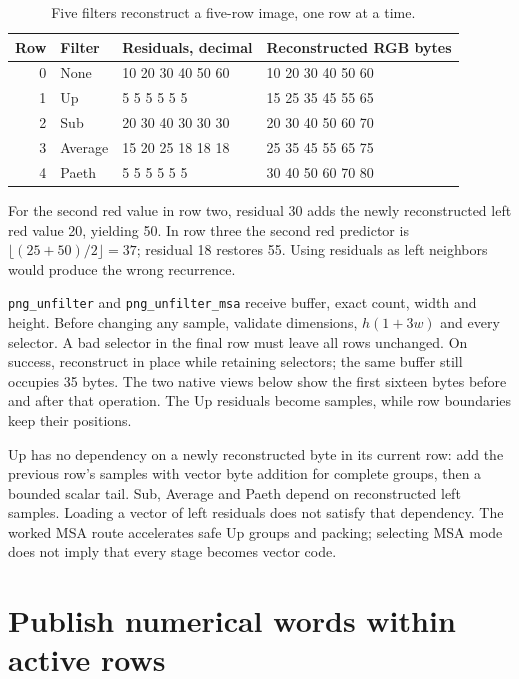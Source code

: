 \begin{table}[!ht]
  \centering
  \begin{tabular}{r l l l}
    \toprule
    Row & Filter  & Residuals, decimal & Reconstructed RGB bytes \\
    \midrule
    0   & None    & 10 20 30 40 50 60  & 10 20 30 40 50 60       \\
    1   & Up      & 5 5 5 5 5 5        & 15 25 35 45 55 65       \\
    2   & Sub     & 20 30 40 30 30 30  & 20 30 40 50 60 70       \\
    3   & Average & 15 20 25 18 18 18  & 25 35 45 55 65 75       \\
    4   & Paeth   & 5 5 5 5 5 5        & 30 40 50 60 70 80       \\
    \bottomrule
  \end{tabular}
  \caption{Five filters reconstruct a five-row image, one row at a time.}
\end{table}

For the second red value in row two, residual 30 adds the newly reconstructed
left red value 20, yielding 50. In row three the second red predictor is
$\lfloor(25+50)/2\rfloor=37$; residual 18 restores 55. Using residuals as
left neighbors would produce the wrong recurrence.

\texttt{png\_unfilter} and \texttt{png\_unfilter\_msa} receive buffer, exact
count, width and height. Before changing any sample, validate dimensions,
$h(1+3w)$ and every selector. A bad selector in the final row must leave all
rows unchanged. On success, reconstruct in place while retaining selectors;
the same buffer still occupies 35 bytes. The two native views below show the
first sixteen bytes before and after that operation. The Up residuals become
samples, while row boundaries keep their positions.



Up has no dependency on a newly reconstructed byte in its current row: add the
previous row's samples with vector byte addition for complete groups, then a
bounded scalar tail. Sub, Average and Paeth depend on reconstructed left
samples. Loading a vector of left residuals does not satisfy that dependency.
The worked MSA route accelerates safe Up groups and packing; selecting MSA
mode does not imply that every stage becomes vector code.

\section{Publish numerical words within active rows}


